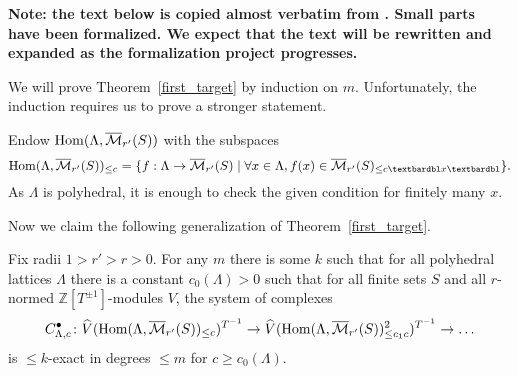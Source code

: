 \begin{remark}
  \label{boundary-text}
  \textbf{Note: the text below is copied almost verbatim from \cite{Analytic}.
  Small parts have been formalized.
  We expect that the text will be rewritten and expanded as the formalization project progresses.}
\end{remark}




We will prove Theorem~\ref{first_target} by induction on $m$.
Unfortunately, the induction requires us to prove a stronger statement.

Endow $\operatorname{Hom}(\Lambda,\overline{\mathcal M}_{r'}(S))$ with the subspaces
\[
\Hom(\Lambda,\overline{\mathcal M}_{r'}(S))_{\leq c} = \{f: \Lambda\to \overline{\mathcal M}_{r'}(S)\mid \forall x\in \Lambda, f(x)\in \overline{\mathcal M}_{r'}(S)_{\leq c‖x‖}\}.
\]
As $\Lambda$ is polyhedral, it is enough to check the given condition for finitely many $x$.

Now we claim the following generalization of Theorem~\ref{first_target}.

\begin{theorem}
  \label{explicit}
  Fix radii $1>r'>r>0$. For any $m$ there is some $k$
  such that for all polyhedral lattices $\Lambda$
  there is a constant $c_0(\Lambda)>0$
  such that for all finite sets $S$
  and all $r$-normed $\mathbb Z[T^{\pm 1}]$-modules $V$,
  the system of complexes
  \[
  C_{\Lambda,c}^\bullet \colon
  \widehat{V}(\operatorname{Hom}(\Lambda,\overline{\mathcal M}_{r'}(S))_{\leq c})^{T^{-1}} \to
  \widehat{V}(\operatorname{Hom}(\Lambda,\overline{\mathcal M}_{r'}(S))_{\leq c_1c}^2)^{T^{-1}} \to \ldots
  \]
  is $\leq k$-exact in degrees $\leq m$ for $c\geq c_0(\Lambda)$.
\end{theorem}

